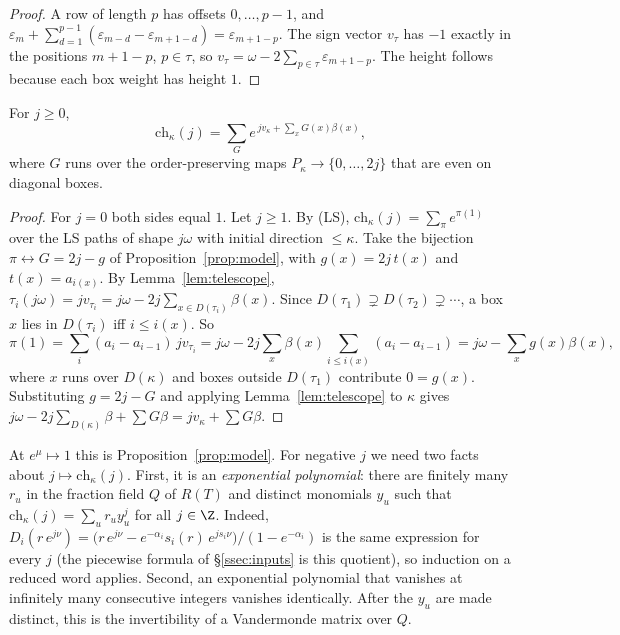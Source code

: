 \begin{proof}
A row of length $p$ has offsets $0,\dots,p-1$, and
$\varepsilon_m+\sum_{d=1}^{p-1}(\varepsilon_{m-d}-\varepsilon_{m+1-d})=\varepsilon_{m+1-p}$. The sign
vector $v_\tau$ has $-1$ exactly in the positions $m+1-p$, $p\in\tau$, so
$v_\tau=\omega-2\sum_{p\in\tau}\varepsilon_{m+1-p}$. The height follows because each box weight
has height $1$.
\end{proof}

\begin{lemma}\label{lem:Tchar}
For $j\ge0$,
\[ \mathrm{ch}_\kappa(j)=\sum_G e^{\,j v_\kappa+\sum_{x}G(x)\beta(x)}, \]
where $G$ runs over the order-preserving maps $P_\kappa\to\{0,\dots,2j\}$ that are even on
diagonal boxes.
\end{lemma}

\begin{proof}
For $j=0$ both sides equal $1$. Let $j\ge1$. By (LS), $\mathrm{ch}_\kappa(j)=\sum_\pi e^{\pi(1)}$
over the LS paths of shape $j\omega$ with initial direction $\le\kappa$. Take the bijection
$\pi\leftrightarrow G=2j-g$ of Proposition~\ref{prop:model}, with $g(x)=2j\,t(x)$ and
$t(x)=a_{i(x)}$. By Lemma~\ref{lem:telescope}, $\tau_i(j\omega)=jv_{\tau_i}=j\omega-2j\sum_{x\in
D(\tau_i)}\beta(x)$. Since $D(\tau_1)\supsetneq D(\tau_2)\supsetneq\cdots$, a box $x$ lies in $D(\tau_i)$
iff $i\le i(x)$. So
\[ \pi(1)=\sum_i(a_i-a_{i-1})\,jv_{\tau_i}=j\omega-2j\sum_x\beta(x)\sum_{i\le i(x)}(a_i-a_{i-1})
=j\omega-\sum_xg(x)\beta(x), \]
where $x$ runs over $D(\kappa)$ and boxes outside $D(\tau_1)$ contribute $0=g(x)$. Substituting
$g=2j-G$ and applying Lemma~\ref{lem:telescope} to $\kappa$ gives
$j\omega-2j\sum_{D(\kappa)}\beta+\sum G\beta=jv_\kappa+\sum G\beta$.
\end{proof}

At $e^\mu\mapsto1$ this is Proposition~\ref{prop:model}. For negative $j$ we need two facts about
$j\mapsto\mathrm{ch}_\kappa(j)$. First, it is an \emph{exponential polynomial}: there are finitely many
$r_u$ in the fraction field $Q$ of $R(T)$ and distinct monomials $y_u$ such that
$\mathrm{ch}_\kappa(j)=\sum_ur_uy_u^j$ for all $j\in\Z$. Indeed,
$D_i(r\,e^{j\nu})=\bigl(r\,e^{j\nu}-e^{-\alpha_i}s_i(r)\,e^{js_i\nu}\bigr)/(1-e^{-\alpha_i})$ is the same
expression for every $j$ (the piecewise formula of \S\ref{ssec:inputs} is this quotient), so
induction on a reduced word applies. Second, an exponential polynomial that vanishes at infinitely
many consecutive integers vanishes identically. After the $y_u$ are made distinct, this is the
invertibility of a Vandermonde matrix over $Q$.

